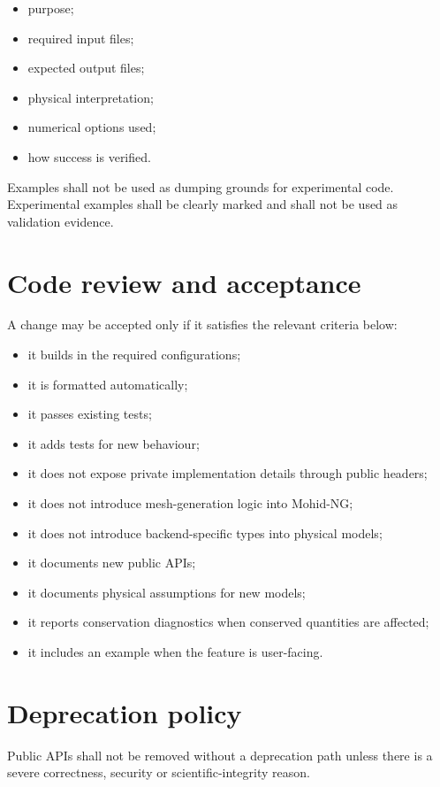 \documentclass[11pt,a4paper]{article}
\begin{document}
\begin{itemize}
  \item purpose;
  \item required input files;
  \item expected output files;
  \item physical interpretation;
  \item numerical options used;
  \item how success is verified.
\end{itemize}

Examples shall not be used as dumping grounds for experimental code. Experimental examples shall be clearly marked and shall not be used as validation evidence.

\section{Code review and acceptance}

A change may be accepted only if it satisfies the relevant criteria below:

\begin{itemize}
  \item it builds in the required configurations;
  \item it is formatted automatically;
  \item it passes existing tests;
  \item it adds tests for new behaviour;
  \item it does not expose private implementation details through public headers;
  \item it does not introduce mesh-generation logic into Mohid-NG;
  \item it does not introduce backend-specific types into physical models;
  \item it documents new public APIs;
  \item it documents physical assumptions for new models;
  \item it reports conservation diagnostics when conserved quantities are affected;
  \item it includes an example when the feature is user-facing.
\end{itemize}

\section{Deprecation policy}

Public APIs shall not be removed without a deprecation path unless there is a severe correctness, security or scientific-integrity reason.
\end{document}
